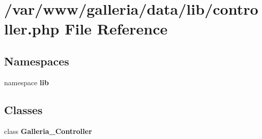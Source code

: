 \section{/var/www/galleria/data/lib/controller.php File Reference}
\label{controller_8php}
\subsection*{Namespaces}
\begin{CompactItemize}
\item 
namespace {\bf lib}
\end{CompactItemize}
\subsection*{Classes}
\begin{CompactItemize}
\item 
class {\bf Galleria\_\-Controller}
\end{CompactItemize}
